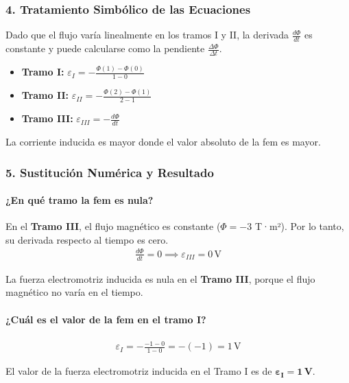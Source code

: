\subsubsection*{4. Tratamiento Simbólico de las Ecuaciones}
Dado que el flujo varía linealmente en los tramos I y II, la derivada $\frac{d\Phi}{dt}$ es constante y puede calcularse como la pendiente $\frac{\Delta\Phi}{\Delta t}$.
\begin{itemize}
    \item \textbf{Tramo I:} $\varepsilon_I = - \frac{\Phi(1) - \Phi(0)}{1 - 0}$
    \item \textbf{Tramo II:} $\varepsilon_{II} = - \frac{\Phi(2) - \Phi(1)}{2 - 1}$
    \item \textbf{Tramo III:} $\varepsilon_{III} = - \frac{d\Phi}{dt}$
\end{itemize}
La corriente inducida es mayor donde el valor absoluto de la fem es mayor.

\subsubsection*{5. Sustitución Numérica y Resultado}
\paragraph*{¿En qué tramo la fem es nula?}
En el \textbf{Tramo III}, el flujo magnético es constante ($\Phi = -3$ T·m²). Por lo tanto, su derivada respecto al tiempo es cero.
\begin{gather}
    \frac{d\Phi}{dt} = 0 \implies \varepsilon_{III} = 0 \, \text{V}
\end{gather}
\begin{cajaresultado}
    La fuerza electromotriz inducida es nula en el \textbf{Tramo III}, porque el flujo magnético no varía en el tiempo.
\end{cajaresultado}

\paragraph*{¿Cuál es el valor de la fem en el tramo I?}
\begin{gather}
    \varepsilon_I = - \frac{-1 - 0}{1 - 0} = -(-1) = 1 \, \text{V}
\end{gather}
\begin{cajaresultado}
    El valor de la fuerza electromotriz inducida en el Tramo I es de $\boldsymbol{\varepsilon_I = 1 \, V}$.
\end{cajaresultado}

